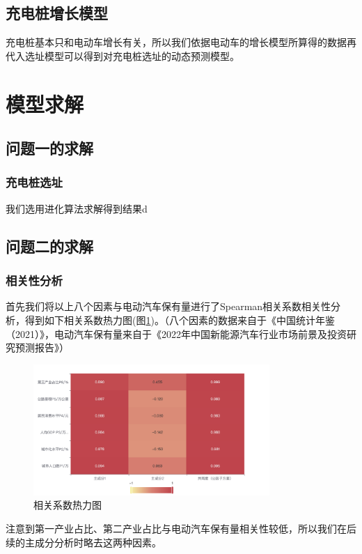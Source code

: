 \documentclass[12pt, a4paper, oneside]{ctexart}
\begin{document}
\subsection{充电桩增长模型}
充电桩基本只和电动车增长有关，所以我们依据电动车的增长模型所算得的数据再代入选址模型可以得到对充电桩选址的动态预测模型。
\section{模型求解}
\subsection{问题一的求解}
\subsubsection{充电桩选址}
我们选用进化算法求解得到结果d
\subsection{问题二的求解}
\subsubsection{相关性分析}
首先我们将以上八个因素与电动汽车保有量进行了Spearman相关系数相关性分析，得到如下相关系数热力图(图\ref{fig:相关系数热力图})。（八个因素的数据来自于《中国统计年鉴（2021）》\cite{cite:统计年鉴}，电动汽车保有量来自于《2022年中国新能源汽车行业市场前景及投资研究预测报告》\cite{cite:预测报告}）
\begin{figure}[h]
    \centering
    \includegraphics[width=0.8\textwidth]{pic/相关系数热力图.png}
    \caption{相关系数热力图}
    \label{fig:相关系数热力图}
\end{figure}

注意到第一产业占比、第二产业占比与电动汽车保有量相关性较低，所以我们在后续的主成分分析时略去这两种因素。
\end{document}
